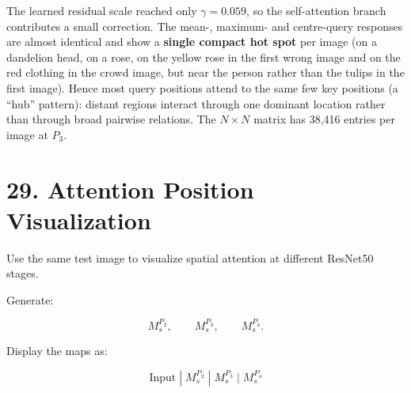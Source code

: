 \documentclass[10pt]{article}
\begin{document}
The learned residual scale reached only $\gamma=0.059$, so the self-attention branch contributes a small correction. The mean-, maximum- and centre-query responses are almost identical and show a \textbf{single compact hot spot} per image (on a dandelion head, on a rose, on the yellow rose in the first wrong image and on the red clothing in the crowd image, but near the person rather than the tulips in the first image). Hence most query positions attend to the same few key positions (a ``hub'' pattern): distant regions interact through one dominant location rather than through broad pairwise relations. The $N\times N$ matrix has 38{,}416 entries per image at $P_3$.
\begin{table}[H]
\centering
\caption{Growth of the self-attention matrix with resolution ($d=C/8$, fp32, one head).}
\scriptsize
{}
\end{table}


\section*{29. Attention Position Visualization}

Use the same test image to visualize spatial attention at different ResNet50
stages.

Generate:

\[
M_s^{P_2},
\qquad
M_s^{P_3},
\qquad
M_s^{P_4}.
\]

Display the maps as:

\[
\boxed{
\text{Input}
\;|\;
M_s^{P_2}
\;|\;
M_s^{P_3}
\;|\;
M_s^{P_4}
}
\]
\end{document}

